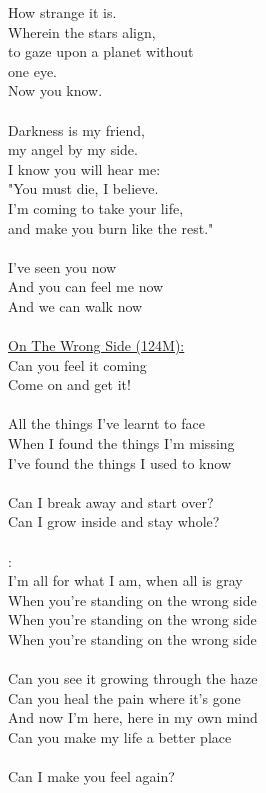 \documentclass[11pt]{article}
\begin{document}
How strange it is.\\
Wherein the stars align,\\
to gaze upon a planet without\\
one eye.\\
Now you know.\\
\\
Darkness is my friend,\\
my angel by my side.\\
I know you will hear me:\\
"You must die, I believe.\\
I'm coming to take your life,\\
and make you burn like the rest."\\
\\
I've seen you now\\
And you can feel me now\\
And we can walk now\\
\\
\underline{On The Wrong Side (124M):}\\
Can you feel it coming\\
Come on and get it!\\
\\
All the things I've learnt to face\\
When I found the things I'm missing\\
I've found the things I used to know\\
\\
Can I break away and start over?\\
Can I grow inside and stay whole?\\
\\
[Chorus]:\\
I'm all for what I am, when all is gray\\
When you're standing on the wrong side\\
When you're standing on the wrong side\\
When you're standing on the wrong side\\
\\
Can you see it growing through the haze\\
Can you heal the pain where it's gone\\
And now I'm here, here in my own mind\\
Can you make my life a better place\\
\\
Can I make you feel again?\\
\end{document}
